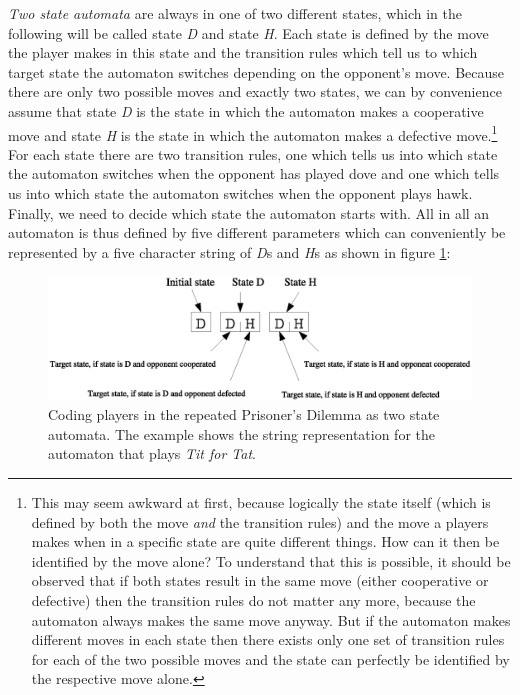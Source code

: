 {\em Two state automata} are always in one of two different states,
which in the following will be called state {\em D} and state {\em H}.
Each state is defined by the move the player makes in this state and
the transition rules which tell us to which target state the automaton
switches depending on the opponent's move. Because there are only two
possible moves and exactly two states, we can by convenience assume
that state {\em D} is the state in which the automaton makes a
cooperative move and state {\em H} is the state in which the automaton
makes a defective move.\footnote{This may seem awkward at first,
  because logically the state itself (which is defined by both the
  move {\em and} the transition rules) and the move a players makes
  when in a specific state are quite different things. How can it
  then be identified by the move alone? To understand that this is
  possible, it should be observed that if both states result in the
  same move (either cooperative or defective) then the transition
  rules do not matter any more, because the automaton always makes the
  same move anyway.  But if the automaton makes different moves in
  each state then there exists only one set of transition rules for
  each of the two possible moves and the state can perfectly
  be identified by the respective move alone.}  For each state there
are two transition rules, one which tells us into which state the
automaton switches when the opponent has played dove and one which
tells us into which state the automaton switches when the opponent
plays hawk. Finally, we need to decide which state the automaton
starts with.  All in all an automaton is thus defined by five
different parameters which can conveniently be represented by a five
character string of {\em D}s and {\em H}s as shown in figure
\ref{AutomataRepresentation}:

\begin{figure}
\begin{center}
\includegraphics[width=12cm]{images/AutomataRepresentation.eps}
\caption{\label{AutomataRepresentation} Coding players in the repeated
  Prisoner's Dilemma as two state automata. The example shows the
  string representation for the automaton that plays {\em Tit for
    Tat}.}
\end{center}
\end{figure}

